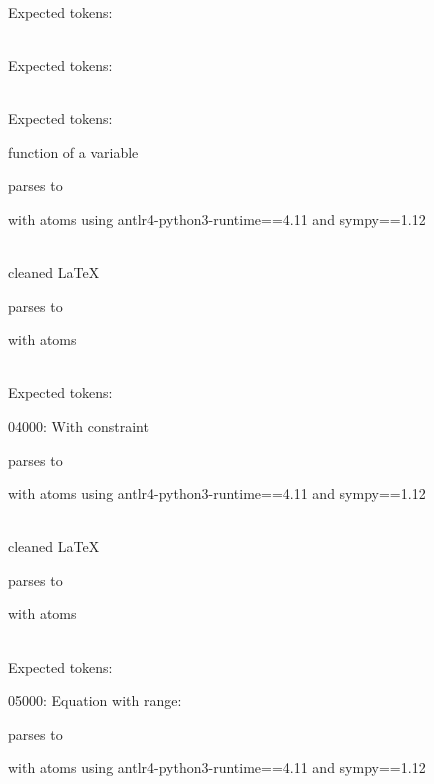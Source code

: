 \documentclass{article}
\begin{document}
\ \\
Expected tokens: 


\hrulefill





\ \\
Expected tokens: 


\hrulefill






\ \\
Expected tokens: 


\hrulefill


function of a variable

parses to

with atoms
using antlr4-python3-runtime==4.11 and sympy==1.12

\ \\
cleaned \LaTeX

parses to

with atoms


\ \\
Expected tokens:



\hrulefill

04000:
With constraint

parses to

with atoms
using antlr4-python3-runtime==4.11 and sympy==1.12

\ \\
cleaned \LaTeX

parses to

with atoms


\ \\
Expected tokens:



\hrulefill

05000:
Equation with range:

parses to

with atoms
using antlr4-python3-runtime==4.11 and sympy==1.12
\end{document}
